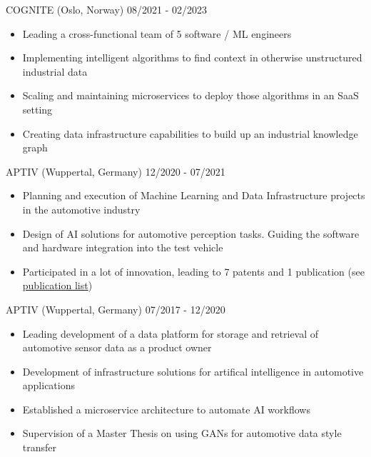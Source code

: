 \documentclass[singlesided,
               paper=a4,
               fontsize=10pt
              ]{my-resume}
\begin{document}
%
	{COGNITE (Oslo, Norway)}
	{08/2021 - 02/2023}
    {\begin{itemize}[leftmargin=2em]
        \item Leading a cross-functional team of 5 software / ML engineers
        \item Implementing intelligent algorithms to find context in otherwise unstructured industrial data
        \item Scaling and maintaining microservices to deploy those algorithms in an SaaS setting
        \item Creating data infrastructure capabilities to build up an industrial knowledge graph
    \end{itemize}}
%
    {APTIV (Wuppertal, Germany)}
    {12/2020 - 07/2021}
    {\begin{itemize}[leftmargin=2em]
        \item Planning and execution of Machine Learning and Data Infrastructure projects in the automotive industry
        \item Design of AI solutions for automotive perception tasks. Guiding the software and hardware integration into the test vehicle
        \item Participated in a lot of innovation, leading to 7 patents and 1 publication (see \href{https://scholar.google.com/citations?hl=de&user=MnU8ZxwAAAAJ}{publication list})
    \end{itemize}}
%
    {APTIV (Wuppertal, Germany)}
    {07/2017 - 12/2020}
    {\begin{itemize}[leftmargin=2em]
        \item Leading development of a data platform for storage and retrieval of automotive sensor data as a product owner
        \item Development of infrastructure solutions for artifical intelligence in automotive applications 
        \item Established a microservice architecture to automate AI workflows
        \item Supervision of a Master Thesis on using GANs for automotive data style transfer
    \end{itemize}}
\end{document}
